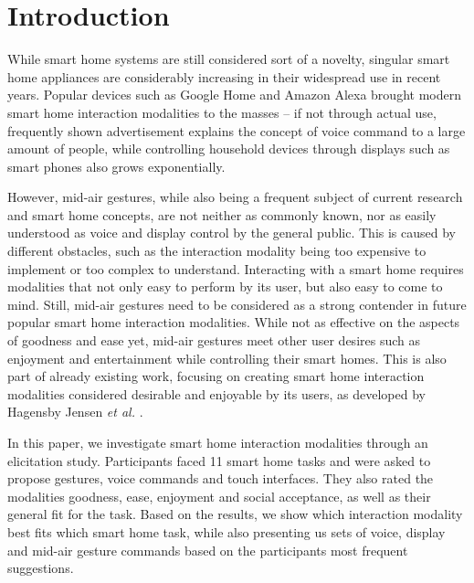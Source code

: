 \documentclass[sigchi]{acmart}
\begin{document}
	
	
	
	
	\maketitle
	
	\section{Introduction}
	While smart home systems are still considered sort of a novelty, singular smart home appliances are considerably increasing in their widespread use in recent years. Popular devices such as Google Home and Amazon Alexa brought modern smart home interaction modalities to the masses – if not through actual use, frequently shown advertisement explains the concept of voice command to a large amount of people, while controlling household devices through displays such as smart phones also grows exponentially. 
	
	However, mid-air gestures, while also being a frequent subject of current research and smart home concepts, are not neither as commonly known, nor as easily understood as voice and display control by the general public. This is caused by different obstacles, such as the interaction modality being too expensive to implement or too complex to understand. Interacting with a smart home requires modalities that not only easy to perform by its user, but also easy to come to mind. Still, mid-air gestures need to be considered as a strong contender in future popular smart home interaction modalities. While not as effective on the aspects of goodness and ease yet, mid-air gestures meet other user desires such as enjoyment and entertainment while controlling their smart homes. This is also part of already existing work, focusing on creating smart home interaction modalities considered desirable and enjoyable by its users, as developed by Hagensby Jensen \textit{et al.} \cite{Jensen.2018}. 
	 
	In this paper, we investigate smart home interaction modalities through an elicitation study. Participants faced 11 smart home tasks and were asked to propose gestures, voice commands and touch interfaces. They also rated the modalities goodness, ease, enjoyment and social acceptance, as well as their general fit for the task. Based on the results, we show which interaction modality best fits which smart home task, while also presenting us sets of voice, display and mid-air gesture commands based on the participants most frequent suggestions. 
\end{document}
